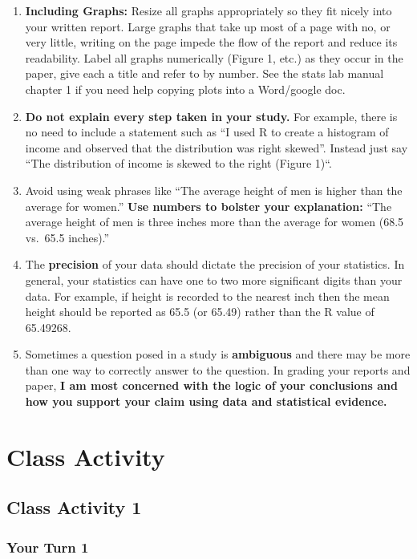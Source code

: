 \documentclass[
]{book}
\begin{document}
\begin{enumerate}
\item
  \textbf{Including Graphs:} Resize all graphs appropriately so they fit nicely into your written report. Large graphs that take up most of a page with no, or very little, writing on the page impede the flow of the report and reduce its readability. Label all graphs numerically (Figure 1, etc.) as they occur in the paper, give each a title and refer to by number. See the stats lab manual chapter 1 if you need help copying plots into a Word/google doc.
\item
  \textbf{Do not explain every step taken in your study.} For example, there is no need to include a statement such as ``I used R to create a histogram of income and observed that the distribution was right skewed''. Instead just say ``The distribution of income is skewed to the right (Figure 1)``.
\item
  Avoid using weak phrases like ``The average height of men is higher than the average for women.'' \textbf{Use numbers to bolster your explanation:} ``The average height of men is three inches more than the average for women (68.5 vs.~65.5 inches).''
\item
  The \textbf{precision} of your data should dictate the precision of your statistics. In general, your statistics can have one to two more significant digits than your data. For example, if height is recorded to the nearest inch then the mean height should be reported as 65.5 (or 65.49) rather than the R value of 65.49268.
\item
  Sometimes a question posed in a study is \textbf{ambiguous} and there may be more than one way to correctly answer to the question. In grading your reports and paper, \textbf{I am most concerned with the logic of your conclusions and how you support your claim using data and statistical evidence.}
\end{enumerate}

\hypertarget{part-class-activity}{%
\part*{Class Activity}\label{part-class-activity}}

\hypertarget{class-activity-1}{%
\chapter{Class Activity 1}\label{class-activity-1}}

\hypertarget{your-turn-1}{%
\section{Your Turn 1}\label{your-turn-1}}
\end{document}
